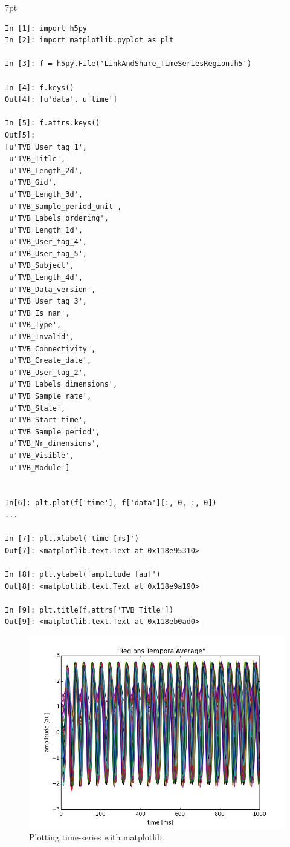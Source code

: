 \documentclass{tufte-handout}
\newenvironment{blah}{%
  \def\FrameCommand{%
    \hspace{1pt}%
    {\color{DarkOrange}\vrule width 2pt}%
    {\color{PeachPuff}\vrule width 4pt}%
    \colorbox{PeachPuff}%
  }%
  \MakeFramed{\advance\hsize-\width\FrameRestore}%
  \noindent\hspace{-4.55pt}%
  \begin{adjustwidth}{}{7pt}%
  \vspace{2pt}\vspace{2pt}%
}
{%
  \vspace{2pt}\end{adjustwidth}\endMakeFramed%
}
\begin{document}
\begin{blah}
\begin{verbatim}
In [1]: import h5py
In [2]: import matplotlib.pyplot as plt

In [3]: f = h5py.File('LinkAndShare_TimeSeriesRegion.h5')

In [4]: f.keys()
Out[4]: [u'data', u'time']

In [5]: f.attrs.keys()
Out[5]: 
[u'TVB_User_tag_1',
 u'TVB_Title',
 u'TVB_Length_2d',
 u'TVB_Gid',
 u'TVB_Length_3d',
 u'TVB_Sample_period_unit',
 u'TVB_Labels_ordering',
 u'TVB_Length_1d',
 u'TVB_User_tag_4',
 u'TVB_User_tag_5',
 u'TVB_Subject',
 u'TVB_Length_4d',
 u'TVB_Data_version',
 u'TVB_User_tag_3',
 u'TVB_Is_nan',
 u'TVB_Type',
 u'TVB_Invalid',
 u'TVB_Connectivity',
 u'TVB_Create_date',
 u'TVB_User_tag_2',
 u'TVB_Labels_dimensions',
 u'TVB_Sample_rate',
 u'TVB_State',
 u'TVB_Start_time',
 u'TVB_Sample_period',
 u'TVB_Nr_dimensions',
 u'TVB_Visible',
 u'TVB_Module']


In[6]: plt.plot(f['time'], f['data'][:, 0, :, 0])
...

In [7]: plt.xlabel('time [ms]')
Out[7]: <matplotlib.text.Text at 0x118e95310>

In [8]: plt.ylabel('amplitude [au]')
Out[8]: <matplotlib.text.Text at 0x118e9a190>

In [9]: plt.title(f.attrs['TVB_Title'])
Out[9]: <matplotlib.text.Text at 0x118eb0ad0>
\end{verbatim}
\end{blah}


\begin{figure}[h]
  \includegraphics[width=\linewidth]{Handout_UI_LinkAndShare_IpythonTimeSeriesRegion.png}%
  \caption{Plotting time-series with matplotlib.}%
  \label{fig:ipython}%
\end{figure}
\end{document}
